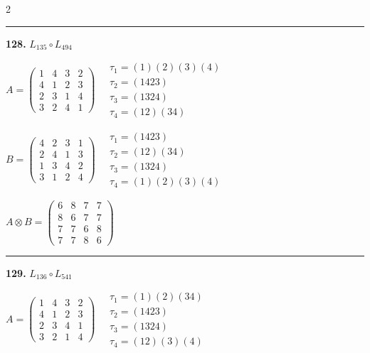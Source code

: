 \begin{multicols}{2}
\vspace{0.3em}
\hrule
\vspace{0.3em}

\noindent\textbf{128.} $L_{135} \circ L_{494}$

$A = \begin{pmatrix} 1 & 4 & 3 & 2 \\ 4 & 1 & 2 & 3 \\ 2 & 3 & 1 & 4 \\ 3 & 2 & 4 & 1 \end{pmatrix} \quad \begin{matrix} \tau_{1}=(1)(2)(3)(4) \\ \tau_{2}=(1 4 2 3) \\ \tau_{3}=(1 3 2 4) \\ \tau_{4}=(1 2)(3 4) \end{matrix}$

$B = \begin{pmatrix} 4 & 2 & 3 & 1 \\ 2 & 4 & 1 & 3 \\ 1 & 3 & 4 & 2 \\ 3 & 1 & 2 & 4 \end{pmatrix} \quad \begin{matrix} \tau_{1}=(1 4 2 3) \\ \tau_{2}=(1 2)(3 4) \\ \tau_{3}=(1 3 2 4) \\ \tau_{4}=(1)(2)(3)(4) \end{matrix}$

$A \otimes B = \begin{pmatrix} 6 & 8 & 7 & 7 \\ 8 & 6 & 7 & 7 \\ 7 & 7 & 6 & 8 \\ 7 & 7 & 8 & 6 \end{pmatrix}$

\vspace{0.3em}
\hrule
\vspace{0.3em}

\noindent\textbf{129.} $L_{136} \circ L_{541}$

$A = \begin{pmatrix} 1 & 4 & 3 & 2 \\ 4 & 1 & 2 & 3 \\ 2 & 3 & 4 & 1 \\ 3 & 2 & 1 & 4 \end{pmatrix} \quad \begin{matrix} \tau_{1}=(1)(2)(3 4) \\ \tau_{2}=(1 4 2 3) \\ \tau_{3}=(1 3 2 4) \\ \tau_{4}=(1 2)(3)(4) \end{matrix}$


\end{multicols}
